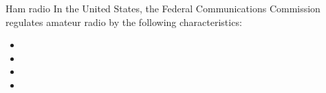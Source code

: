 \begin{frame}[t]{Ham radio}
    In the United States, the Federal Communications Commission regulates amateur radio by the following characteristics:
    \begin{multicols}{2}
        \begin{itemize}
            \item {}
            \item {}
            \item {}
            \item {}
        \end{itemize}
    \end{multicols}
    \centering

\end{frame}
